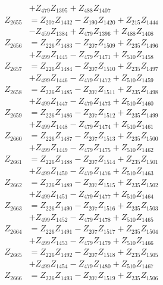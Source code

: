 \begin{multicols}{2}
\begin{align}
&+ Z_{479}Z_{1395} + Z_{488}Z_{1407} \nonumber \\
Z_{2655} &= Z_{207}Z_{1432} - Z_{190}Z_{1420} + Z_{215}Z_{1444}  \nonumber \\
&- Z_{459}Z_{1384} + Z_{479}Z_{1396} + Z_{488}Z_{1408} \nonumber \\
Z_{2656} &= Z_{226}Z_{1483} - Z_{207}Z_{1509} + Z_{235}Z_{1496}  \nonumber \\
&+ Z_{499}Z_{1445} - Z_{479}Z_{1471} + Z_{510}Z_{1458} \nonumber \\
Z_{2657} &= Z_{226}Z_{1484} - Z_{207}Z_{1510} + Z_{235}Z_{1497}  \nonumber \\
&+ Z_{499}Z_{1446} - Z_{479}Z_{1472} + Z_{510}Z_{1459} \nonumber \\
Z_{2658} &= Z_{226}Z_{1485} - Z_{207}Z_{1511} + Z_{235}Z_{1498}  \nonumber \\
&+ Z_{499}Z_{1447} - Z_{479}Z_{1473} + Z_{510}Z_{1460} \nonumber \\
Z_{2659} &= Z_{226}Z_{1486} - Z_{207}Z_{1512} + Z_{235}Z_{1499}  \nonumber \\
&+ Z_{499}Z_{1448} - Z_{479}Z_{1474} + Z_{510}Z_{1461} \nonumber \\
Z_{2660} &= Z_{226}Z_{1487} - Z_{207}Z_{1513} + Z_{235}Z_{1500}  \nonumber \\
&+ Z_{499}Z_{1449} - Z_{479}Z_{1475} + Z_{510}Z_{1462} \nonumber \\
Z_{2661} &= Z_{226}Z_{1488} - Z_{207}Z_{1514} + Z_{235}Z_{1501}  \nonumber \\
&+ Z_{499}Z_{1450} - Z_{479}Z_{1476} + Z_{510}Z_{1463} \nonumber \\
Z_{2662} &= Z_{226}Z_{1489} - Z_{207}Z_{1515} + Z_{235}Z_{1502}  \nonumber \\
&+ Z_{499}Z_{1451} - Z_{479}Z_{1477} + Z_{510}Z_{1464} \nonumber \\
Z_{2663} &= Z_{226}Z_{1490} - Z_{207}Z_{1516} + Z_{235}Z_{1503}  \nonumber \\
&+ Z_{499}Z_{1452} - Z_{479}Z_{1478} + Z_{510}Z_{1465} \nonumber \\
Z_{2664} &= Z_{226}Z_{1491} - Z_{207}Z_{1517} + Z_{235}Z_{1504}  \nonumber \\
&+ Z_{499}Z_{1453} - Z_{479}Z_{1479} + Z_{510}Z_{1466} \nonumber \\
Z_{2665} &= Z_{226}Z_{1492} - Z_{207}Z_{1518} + Z_{235}Z_{1505}  \nonumber \\
&+ Z_{499}Z_{1454} - Z_{479}Z_{1480} + Z_{510}Z_{1467} \nonumber \\
Z_{2666} &= Z_{226}Z_{1493} - Z_{207}Z_{1519} + Z_{235}Z_{1506}  \nonumber \\

\end{align}
\end{multicols}

